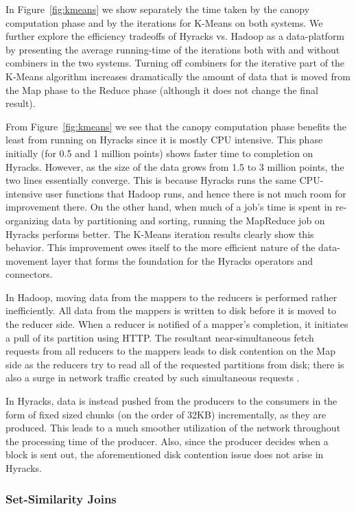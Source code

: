In Figure~\ref{fig:kmeans} we show separately the time taken by the canopy computation
phase and by the iterations for K-Means on both systems. We further explore the efficiency tradeoffs
of Hyracks vs. Hadoop as a data-platform by presenting the average running-time of the iterations both with and
without combiners in the two systems. Turning off combiners for the iterative part
of the K-Means algorithm increases dramatically the amount of data that is moved from the
Map phase to the Reduce phase (although it does not change the final result).

From Figure~\ref {fig:kmeans} we see that the canopy computation phase benefits the least from
running on Hyracks since it is mostly CPU intensive. This phase initially (for 0.5
and 1 million points) shows faster time to completion on Hyracks.
However, as the size of the data grows from 1.5 to 3 million points, the two lines
essentially converge.  This is because Hyracks runs the same CPU-intensive user functions
that Hadoop runs, and hence there is not much room for improvement there.
On the other hand, when much of a job's time is spent in re-organizing data
by partitioning and sorting, running the MapReduce job on Hyracks performs better.
The K-Means iteration results clearly show this behavior.  
This improvement owes itself to the more efficient nature of the data-movement
layer that forms the foundation for the Hyracks operators and connectors.

In Hadoop, moving data from the mappers to the reducers is performed rather inefficiently.
All data from the mappers is written to disk before it is moved to the reducer side.
When a reducer is notified of a mapper's completion, it initiates a pull of its
partition using HTTP. The resultant near-simultaneous fetch requests from all reducers to the mappers
leads to disk contention on the Map side as the reducers try to read all of the requested
partitions from disk; there is also a surge in network traffic created by such
simultaneous requests \cite{conf/nsdi/CondieCAHES10}.

In Hyracks, data is instead pushed from the producers to the consumers in the form of fixed
sized chunks (on the order of 32KB) incrementally, as they are produced. This leads to a much smoother
utilization of the network throughout the processing time of the producer. Also, since the
producer decides when a block is sent out, the aforementioned disk contention issue does not arise
in Hyracks.



\subsubsection{Set-Similarity Joins}

